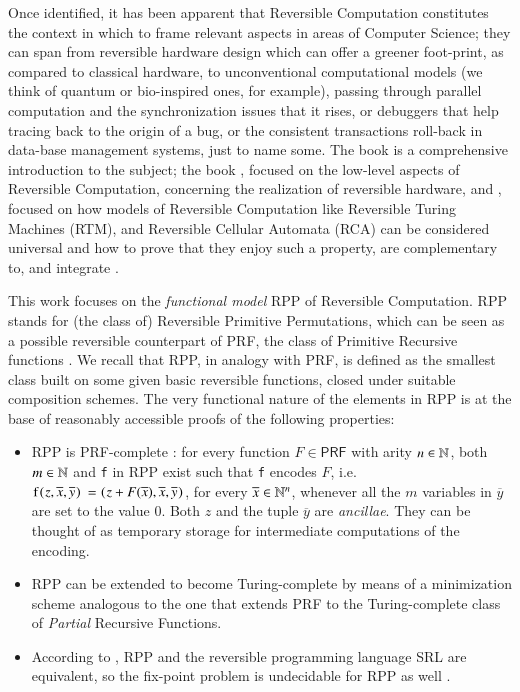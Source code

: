 \documentclass[preprint]{elsarticle}
\theoremstyle{remark}
\newcommand{\RPP}{\textsf{RPP}\xspace}
\newcommand{\PRF}{\textsf{PRF}\xspace}
\newcommand{\SRL}{\textsf{SRL}\xspace}
\begin{document}
Once identified, it has been apparent that Reversible Computation constitutes the context in which to frame relevant aspects in areas of Computer Science; they can span from reversible hardware design which can offer a greener foot-print, as compared to classical hardware, to unconventional computational models (we think of quantum or bio-inspired ones, for example), passing through parallel computation and the synchronization issues that it rises, or debuggers that help tracing back to the origin of a bug, or the consistent transactions roll-back in data-base management systems, just to name some. The book \cite{perumalla2013chc} is a comprehensive introduction to the subject; the book \cite{DBLP:books/daglib/0025734}, focused on the low-level aspects of Reversible Computation, concerning the realization of reversible hardware, and
\cite{DBLP:series/eatcs/Morita17}, focused on how models of Reversible Computation like Reversible Turing Machines (RTM), and Reversible Cellular Automata (RCA) can be considered universal and how to prove that they enjoy such a property, are complementary to, and integrate \cite{perumalla2013chc}.

This work focuses on the \emph{functional model} \RPP \cite{DBLP:journals/tcs/PaoliniPR20} of Reversible Computation.
\RPP stands for (the class of) Reversible Primitive Permutations, which can be seen as a possible reversible counterpart of \PRF, the class of Primitive Recursive functions \cite{rogers1967theory}.
We recall that \RPP, in analogy with \PRF, is defined as the smallest class built on some given basic reversible functions, closed under suitable composition schemes.
The very functional nature of the elements in \RPP is at the base of reasonably accessible proofs of the following properties:
\begin{itemize}
\item \RPP is \PRF-complete \cite{DBLP:journals/tcs/PaoliniPR20}: for every function $ F \in \PRF $ with arity $ n \in \mathbb{N} $, both $ m \in \mathbb{N} $ and \lstinline|f| in \RPP exist such that \lstinline|f| encodes $ F $, i.e.
$ \mbox{\lstinline|f(|}z,\overline{x},\overline{y}\mbox{\lstinline|) = (|}z+F(\overline{x}),\overline{x},\overline{y}\mbox{\lstinline|)|}$, for every $ \overline{x}\in \mathbb{N}^n $, whenever all the $m$ variables in $ \overline{y} $ are set to the value $ 0 $.
Both $ z $ and the tuple $ \overline{y} $ are \emph{ancillae}. They can be thought of as temporary storage for intermediate computations of the encoding.

\item \RPP can be extended to become Turing-complete \cite{Paolini2018NGC} by means of a minimization scheme analogous to the one that extends \PRF to the Turing-complete class of \emph{Partial} Recursive Functions.

\item According to \cite{MatosRC2020}, \RPP and the reversible programming language \SRL \cite{matos03tcs} are equivalent, so the fix-point problem is undecidable for \RPP as well \cite{2318_1734164MatosPaoliniRoversiTCSICTCS18}.
\end{itemize}
\end{document}
